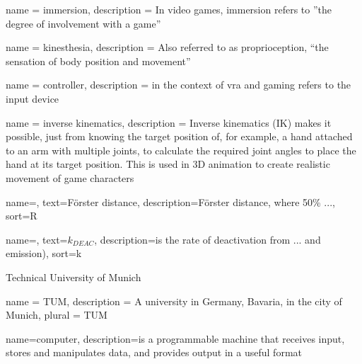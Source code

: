 








{
    name = immersion,
    description = {In video games, immersion refers to ''the degree of involvement with a game'' \autocite{gameImmersion}}
}

{
    name = kinesthesia,
    description = {Also referred to as proprioception, \enquote{the sensation of body position and movement}\autocite{proprioception}}
}

{
    name = controller,
    description = {in the context of \gls{vra} and gaming refers to the input device}
}

{
    name = {inverse kinematics},
    description = {Inverse kinematics (IK) makes it possible, just from knowing the target position of, for example, a hand attached to an arm with multiple joints, to calculate the required joint angles to place the hand at its target position. This is used in 3D animation to create realistic movement of game characters \autocite[p. ~3f]{bodyTrackingVR}}
}




{
  name=,
  text=F\"{o}rster distance,
  description={F\"{o}rster distance, where 50\% ...}, 
  sort=R
}

{
  name=,
  text=$k_{DEAC}$, 
  description={is the rate of deactivation from ... and emission)}, 
  sort=k
}

{Technical University of Munich}

{
  name = TUM,
  description = {A university in Germany, Bavaria, in the city of Munich},
  plural = TUM
}

{
  name=computer,
  description={is a programmable machine that receives input,
               stores and manipulates data, and provides
               output in a useful format}
}